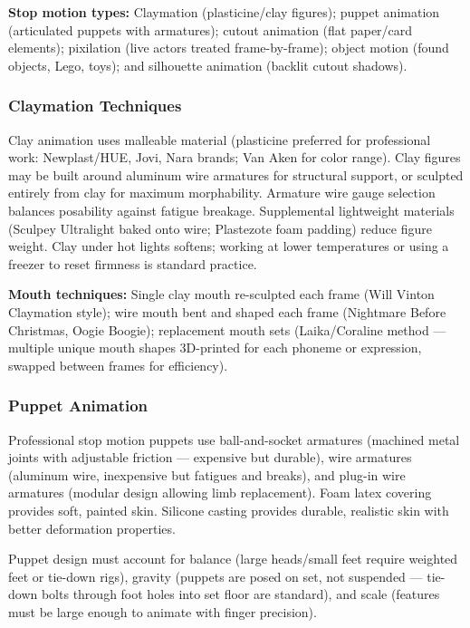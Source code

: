 \documentclass[11pt,letterpaper]{article}
\begin{document}
\textbf{Stop motion types:} Claymation (plasticine/clay figures); puppet animation (articulated puppets with armatures); cutout animation (flat paper/card elements); pixilation (live actors treated frame-by-frame); object motion (found objects, Lego, toys); and silhouette animation (backlit cutout shadows).

\subsubsection{Claymation Techniques}

Clay animation uses malleable material (plasticine preferred for professional work: Newplast/HUE, Jovi, Nara brands; Van Aken for color range). Clay figures may be built around aluminum wire armatures for structural support, or sculpted entirely from clay for maximum morphability. Armature wire gauge selection balances posability against fatigue breakage. Supplemental lightweight materials (Sculpey Ultralight baked onto wire; Plastezote foam padding) reduce figure weight. Clay under hot lights softens; working at lower temperatures or using a freezer to reset firmness is standard practice.

\textbf{Mouth techniques:} Single clay mouth re-sculpted each frame (Will Vinton Claymation style); wire mouth bent and shaped each frame (Nightmare Before Christmas, Oogie Boogie); replacement mouth sets (Laika/Coraline method --- multiple unique mouth shapes 3D-printed for each phoneme or expression, swapped between frames for efficiency).

\subsubsection{Puppet Animation}

Professional stop motion puppets use ball-and-socket armatures (machined metal joints with adjustable friction --- expensive but durable), wire armatures (aluminum wire, inexpensive but fatigues and breaks), and plug-in wire armatures (modular design allowing limb replacement). Foam latex covering provides soft, painted skin. Silicone casting provides durable, realistic skin with better deformation properties.

Puppet design must account for balance (large heads/small feet require weighted feet or tie-down rigs), gravity (puppets are posed on set, not suspended --- tie-down bolts through foot holes into set floor are standard), and scale (features must be large enough to animate with finger precision).
\end{document}
